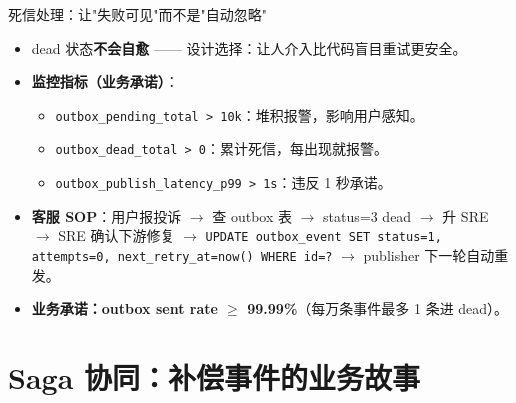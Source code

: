 \documentclass[aspectratio=169,11pt]{beamer}
\begin{document}
\begin{frame}[shrink]{死信处理：让"失败可见"而不是"自动忽略"}
\begin{itemize}
  \item dead 状态\textbf{不会自愈} —— 设计选择：让人介入比代码盲目重试更安全。
  \item \textbf{监控指标（业务承诺）}：
  \begin{itemize}
    \item \texttt{outbox\_pending\_total > 10k}：堆积报警，影响用户感知。
    \item \texttt{outbox\_dead\_total > 0}：累计死信，每出现就报警。
    \item \texttt{outbox\_publish\_latency\_p99 > 1s}：违反 1 秒承诺。
  \end{itemize}
  \item \textbf{客服 SOP}：用户报投诉 $\to$ 查 outbox 表 $\to$ status=3 dead $\to$ 升 SRE $\to$ SRE 确认下游修复 $\to$ \texttt{UPDATE outbox\_event SET status=1, attempts=0, next\_retry\_at=now() WHERE id=?} $\to$ publisher 下一轮自动重发。
  \item \textbf{业务承诺：outbox sent rate $\geq$ 99.99\%}（每万条事件最多 1 条进 dead）。
\end{itemize}
\end{frame}

\section{Saga 协同：补偿事件的业务故事}
\end{document}
